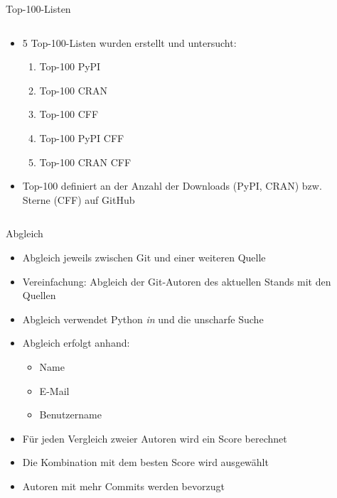 \documentclass[%
    handout,
    aspectratio=1610,
    10pt,
    onlytextwidth, %
]{beamer}
\begin{document}
\begin{frame}{Top-100-Listen}
    \begin{columns}
        \begin{column}[t]{0.39\textwidth}
            \begin{itemize}
                \item 5 Top-100-Listen wurden erstellt und untersucht:
                \begin{enumerate}
                    \item Top-100 PyPI
                    \item Top-100 CRAN
                    \item Top-100 CFF
                    \item Top-100 PyPI CFF
                    \item Top-100 CRAN CFF
                \end{enumerate}
                \item Top-100 definiert an der Anzahl der Downloads (PyPI, CRAN) bzw. Sterne (CFF) auf GitHub
            \end{itemize}
        \end{column}
        \begin{column}[t]{0.59\textwidth}
            \begin{center}
                
            \end{center}
        \end{column}
    \end{columns}
\end{frame}


\begin{frame}{Abgleich}
    \begin{itemize}
        \item Abgleich jeweils zwischen Git und einer weiteren Quelle
        \item Vereinfachung: Abgleich der Git-Autoren des aktuellen Stands mit den Quellen
        \item Abgleich verwendet Python \emph{in} und die unscharfe Suche
        \item Abgleich erfolgt anhand:
        \begin{itemize}
            \item Name
            \item E-Mail
            \item Benutzername
        \end{itemize}
        \item Für jeden Vergleich zweier Autoren wird ein Score berechnet
        \item Die Kombination mit dem besten Score wird ausgewählt
        \item Autoren mit mehr Commits werden bevorzugt
    \end{itemize}
\end{frame}
\end{document}
